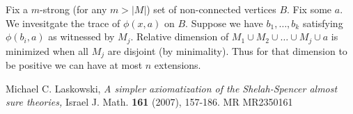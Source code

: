 \documentclass{amsart}
\begin{document}
Fix a $m$-strong (for any $m > |M|$) set of non-connected vertices $B$. Fix some $a$. We invesitgate the trace of $\phi(x, a)$ on $B$. Suppose we have $b_1, \ldots, b_k$ satisfying $\phi(b_i, a)$ as witnessed by $M_j$. Relative dimension of $M_1 \cup M_2 \cup \ldots \cup M_j \cup {a}$ is minimized when all $M_j$ are disjoint (by minimality). Thus for that dimension to be positive we can have at most $n$ extensions.

\begin{thebibliography}{9}

	Michael C. Laskowski, \textsl{A simpler axiomatization of the Shelah-Spencer almost sure theories,}
	Israel J. Math. \textbf{161} (2007), 157-186. MR MR2350161

\end{thebibliography}
\end{document}
